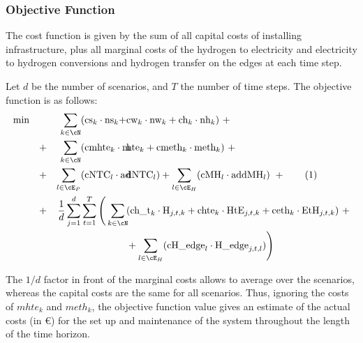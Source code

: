 
\subsubsection{Objective Function}

The cost function is given by the sum of all capital costs of installing infrastructure, plus all marginal costs of the hydrogen to electricity and electricity to hydrogen conversions and hydrogen transfer on the edges at each time step.

Let $d$ be the number of scenarios, and $T$ the number of time steps. The objective function is as follows:
\begin{align*}
    \min \quad 
    &&\sum_{k\in\cN}&(\text{cs}_k \cdot \text{ns}_k+\hspace{-1em}&&\text{cw}_k \cdot \text{nw}_k + \text{ch}_k \cdot \text{nh}_k )\ + \\
    &+& \sum_{k\in\cN}&(\text{cmhte}_k\cdot\text{m} \hspace{-2em}&& \text{hte}_k + \text{cmeth}_k\cdot \text{meth}_k) \ + \\
    &+& \sum_{l\in\cE_P}& (\text{cNTC}_l\cdot \text{ad}\hspace{-2em}&&\text{dNTC}_l) 
    + \sum_{l\in\cE_H} (\text{cMH}_l\cdot \text{addMH}_l) \ + \stepcounter{equation}\tag{\theequation}\label{objVal} \\   
    &+&\frac{1}{d}\sum_{j=1}^{d}&\sum_{t=1}^{T} \Bigg(\sum_{k\in\cN} \hspace{-5em}&&
    (\text{ch\_t}_k \cdot \text{H}_{j,t,k} + \text{chte}_k \cdot \text{HtE}_{j,t,k} + \text{ceth}_k \cdot \text{EtH}_{j,t,k})\ + \\
    &&&\hspace{-2em}&&+\sum_{l\in\cE_H} (\text{cH\_edge}_l\cdot\text{H\_edge}_{j,t,l}) \Bigg)
\end{align*}

The $1/d$ factor in front of the marginal costs allows to average over the scenarios, whereas the capital costs are the same for all scenarios. 
Thus, ignoring the costs of $mhte_k$ and $meth_k$, the objective function value gives an estimate of the actual costs (in \euro) for the set up and maintenance of the system throughout the length of the time horizon. 



